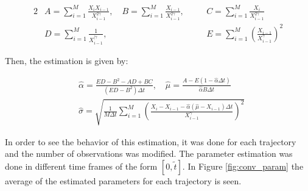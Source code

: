 \documentclass[11pt]{article}
\theoremstyle{definition}
\theoremstyle{remark}
\theoremstyle{remark}
\begin{document}
\begin{alignat*}{2}
  &A = \sum_{i=1}^M \frac{X_iX_{i-1}}{X_{i-1}^{2\gamma}}, \quad
  B= \sum_{i=1}^M \frac{X_{i-1}}{X_{i-1}^{2\gamma}}, \quad
  &&C = \sum_{i=1}^M \frac{X_i}{X_{i-1}^{2\gamma}} \\
  &D = \sum_{i=1}^M \frac{1}{X_{i-1}^{|\gamma}}, \quad
  &&E = \sum_{i=1}^M \left(\frac{X_{i-1}}{X_{i-1}^\gamma}\right)^2
\end{alignat*}

Then, the estimation is given by:

\begin{align*}
  &\hat{\alpha} = \frac{ED - B^2 - AD + BC}{(ED - B^2)\Delta t}, \quad
    \hat{\mu} = \frac{A - E(1 - \hat{\alpha} \Delta t)}{\hat{\alpha} B \Delta t} \\
  &\hat{\sigma} = \sqrt{\frac{1}{M \Delta t} \sum_{i=1}^M
    \left(\frac{X_i - X_{i-1} - \hat{\alpha}(\hat{\mu} - X_{i-1})\Delta t}{
    X_{i-1}^\gamma}\right)^2}
\end{align*}

In order to see the behavior of this estimation, it was
done for each trajectory and the number of observations was
modified. The parameter estimation was done in different time frames
of the form $[0, \tilde{t}]$. In Figure \ref{fig:conv_param} the
average of the estimated parameters for each trajectory is seen.
\end{document}
